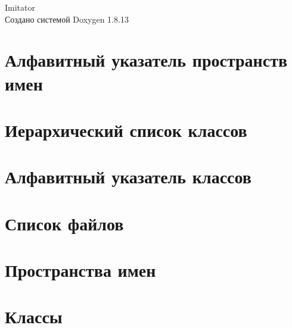 \documentclass[twoside]{book}
\newcommand{\+}{\discretionary{\mbox{\scriptsize$\hookleftarrow$}}{}{}}
\newcommand{\clearemptydoublepage}{%
  \newpage{\pagestyle{empty}\cleardoublepage}%
}
\begin{document}
\hypersetup{pageanchor=false,
             bookmarksnumbered=true,
             pdfencoding=unicode
            }
\begin{titlepage}
\vspace*{7cm}
\begin{center}%
{\Large Imitator }\\
\vspace*{1cm}
{\large Создано системой Doxygen 1.8.13}\\
\end{center}
\end{titlepage}
\clearemptydoublepage
{}
\tableofcontents
\clearemptydoublepage
{}
\hypersetup{pageanchor=true}

\chapter{Алфавитный указатель пространств имен}

\chapter{Иерархический список классов}

\chapter{Алфавитный указатель классов}

\chapter{Список файлов}

\chapter{Пространства имен}

\chapter{Классы}






















\end{document}
